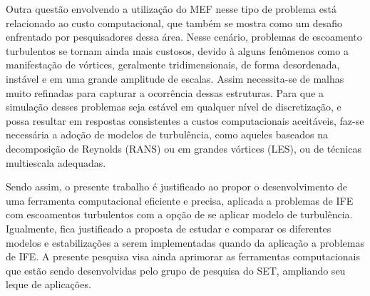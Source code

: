 Outra questão envolvendo a utilização do MEF nesse tipo de problema está relacionado ao custo computacional, que também se mostra como um desafio enfrentado por pesquisadores dessa área. Nesse cenário, problemas de escoamento turbulentos se tornam ainda mais custosos, devido à alguns fenômenos como a manifestação de vórtices, geralmente tridimensionais, de forma desordenada, instável e em uma grande amplitude de escalas. Assim necessita-se de malhas muito refinadas para capturar a ocorrência dessas estruturas. Para que a simulação desses problemas seja estável em qualquer nível de discretização, e possa resultar em respostas consistentes a custos computacionais aceitáveis, faz-se necessária a adoção de modelos de turbulência, como  aqueles baseados na decomposição de Reynolds (RANS) ou em grandes vórtices (LES), ou de técnicas multiescala adequadas.

Sendo assim, o presente trabalho é justificado ao propor o desenvolvimento de uma ferramenta computacional eficiente e precisa, aplicada a problemas de IFE com escoamentos turbulentos com a opção de se aplicar modelo de turbulência. Igualmente, fica justificado a proposta de estudar e comparar os diferentes modelos e estabilizações a serem implementadas quando da aplicação a problemas de IFE. A presente pesquisa visa ainda aprimorar as ferramentas computacionais que estão sendo desenvolvidas pelo grupo de pesquisa do SET, ampliando seu leque de aplicações.